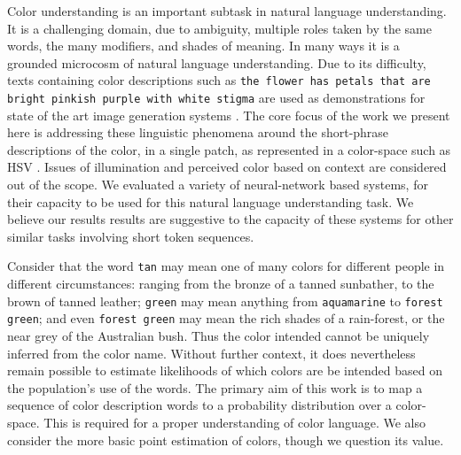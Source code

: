 \documentclass[11pt,a4paper]{article}
\newcommand{\parencite}{\citep}
\begin{document}
Color understanding is an important subtask in natural language understanding.
It is a challenging domain, due to ambiguity, multiple roles taken by the same words, the many modifiers, and shades of meaning.
In many ways it is a grounded microcosm of natural language understanding.
Due to its difficulty, texts containing color descriptions such as \texttt{the flower has petals that are bright pinkish purple with white stigma} are used as demonstrations for state of the art image generation systems \parencite{reed2016generative, 2015arXiv151102793M}.
The core focus of the work we present here is addressing these linguistic phenomena around the short-phrase descriptions of the color, in a single patch, as represented in a color-space such as HSV \parencite{smith1978color}.
Issues of illumination and perceived color based on context are considered out of the scope.
We evaluated a variety of neural-network based systems, for their capacity to be used for this natural language understanding task.
We believe our results results are suggestive to the capacity of these systems for other similar tasks involving short token sequences.


Consider that the word \texttt{tan} may mean one of many colors for different people in different circumstances: ranging from the bronze of a tanned sunbather, to the brown of tanned leather;
\texttt{green} may mean anything from \texttt{aquamarine} to \texttt{forest green};
and even \texttt{forest green} may mean the rich shades of a rain-forest, or the near grey of the Australian bush.
Thus the color intended cannot be uniquely inferred from the color name.
Without further context, it does nevertheless remain possible to estimate likelihoods of which colors are be intended based on the population's use of the words.
The primary aim of this work is to map a sequence of color description words to a probability distribution over a color-space.
This is required for a proper understanding of color language.
We also consider the more basic point estimation of colors, though we question its value.
\end{document}
